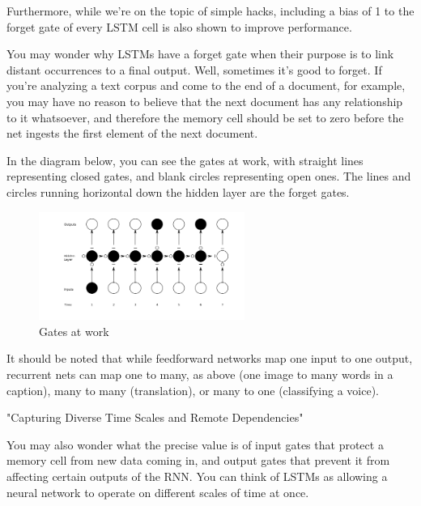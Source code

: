 {Furthermore, while we’re on the topic of simple hacks, including a bias of 1 to the forget gate of every LSTM cell is also shown to improve performance.

You may wonder why LSTMs have a forget gate when their purpose is to link distant occurrences to a final output. Well, sometimes it’s good to forget. If you’re analyzing a text corpus and come to the end of a document, for example, you may have no reason to believe that the next document has any relationship to it whatsoever, and therefore the memory cell should be set to zero before the net ingests the first element of the next document.

In the diagram below, you can see the gates at work, with straight lines representing closed gates, and blank circles representing open ones. The lines and circles running horizontal down the hidden layer are the forget gates.

\renewcommand{\figurename}{Abb.}
\begin{figure}[htp]
\centering
\includegraphics[width=0.60\textwidth]{pictures/gates_lstm.png}
\caption[Gates at work]{Gates at work\protect\footnotemark}
\end{figure}

It should be noted that while feedforward networks map one input to one output, recurrent nets can map one to many, as above (one image to many words in a caption), many to many (translation), or many to one (classifying a voice).

"Capturing Diverse Time Scales and Remote Dependencies"

You may also wonder what the precise value is of input gates that protect a memory cell from new data coming in, and output gates that prevent it from affecting certain outputs of the RNN. You can think of LSTMs as allowing a neural network to operate on different scales of time at once.

}

